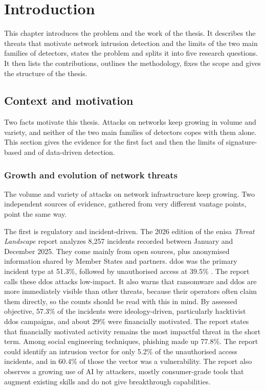 \chapter{Introduction}
\label{ch:introduction}

This chapter introduces the problem and the work of the thesis. It describes the threats
that motivate network intrusion detection and the limits of the two main families of
detectors, states the problem and splits it into five research questions. It then lists the
contributions, outlines the methodology, fixes the scope and gives the structure of the thesis.

\section{Context and motivation}
\label{sec:context-motivation}

Two facts motivate this thesis. Attacks on networks keep growing in volume and variety, and
neither of the two main families of detectors copes with them alone. This section gives the
evidence for the first fact and then the limits of signature-based and of data-driven
detection.

\subsection{Growth and evolution of network threats}
\label{sec:growth-evolution-threats}

The volume and variety of attacks on network infrastructure keep growing. Two
independent sources of evidence, gathered from very different vantage
points, point the same way.

The first is regulatory and incident-driven. The 2026 edition of the
\gls{enisa} \emph{Threat Landscape} report analyzes 8{,}257 incidents
recorded between January and December 2025. They come mainly from open
sources, plus anonymised information shared by Member States and partners.
\gls{ddos} was the primary incident type at 51.3\%, followed by
unauthorised access at 39.5\% \citep{enisa2026threatlandscape}. The report
calls these \gls{ddos} attacks low-impact. It also warns that ransomware and
\gls{ddos} are more immediately visible than other threats, because their
operators often claim them directly, so the counts should be read with this
in mind. By assessed objective, 57.3\% of the incidents were ideology-driven,
particularly hacktivist \gls{ddos} campaigns, and about 29\% were financially
motivated. The report states that financially motivated activity remains the
most impactful threat in the short term.
Among social engineering techniques, phishing made up 77.8\%. The report
could identify an intrusion vector for only 5.2\% of the unauthorised access
incidents, and in 60.4\% of those the vector was a vulnerability. The report
also observes a growing use of AI by attackers, mostly consumer-grade tools
that augment existing skills and do not give breakthrough capabilities.

